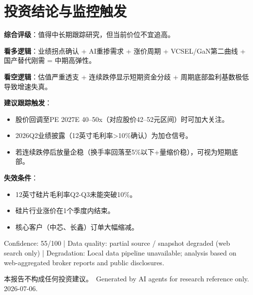 \documentclass[a4paper,11pt,fontset=none]{ctexart}
\newcommand{\reportdisclaimer}{本报告不构成任何投资建议。}
\begin{document}
\section{投资结论与监控触发}

\textbf{综合评级}：值得中长期跟踪研究，但当前价位不宜追高。

\textbf{看多逻辑}：业绩拐点确认 + AI重掺需求 + 涨价周期 + VCSEL/GaN第二曲线 + 国产替代刚需 = 中期高弹性。

\textbf{看空逻辑}：估值严重透支 + 连续跌停显示短期资金分歧 + 周期底部盈利基数极低导致增速失真。

\textbf{建议跟踪触发}：
\begin{itemize}
  \item 股价回调至PE 2027E 40--50x（对应股价42--52元区间）时可加大关注。
  \item 2026Q2业绩披露（12英寸毛利率>10\%确认）为加仓信号。
  \item 若连续跌停后放量企稳（换手率回落至5\%以下+量缩价稳），可视为短期底部。
\end{itemize}

\textbf{失效条件}：
\begin{itemize}
  \item 12英寸硅片毛利率Q2-Q3未能突破10\%。
  \item 硅片行业涨价在1个季度内结束。
  \item 核心客户（中芯、长鑫）订单大幅缩减。
\end{itemize}

\vfill
\begin{disclosurebox}[Metadata]
\footnotesize
Confidence: 55/100 \quad | \quad
Data quality: partial source / snapshot degraded (web search only) \quad | \quad
Degradation: Local data pipeline unavailable; analysis based on web-aggregated broker reports and public disclosures.

\vspace{0.4em}
{\tiny\reportdisclaimer\ Generated by AI agents for research reference only. 2026-07-06.}
\end{disclosurebox}
\end{document}
